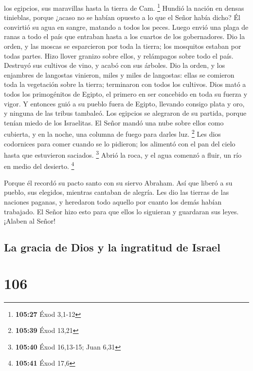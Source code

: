 los egipcios, sus maravillas hasta la tierra de Cam. \footnote{\textbf{105:27}
  Éxod 3,1-12}  Hundió la nación en densas tinieblas,
porque ¿acaso no se habían opuesto a lo que el Señor había dicho?
 Él convirtió su agua en sangre, matando a todos los peces.
 Luego envió una plaga de ranas a todo el país que entraban
hasta a los cuartos de los gobernadores.  Dio la orden, y
las moscas se esparcieron por toda la tierra; los mosquitos estaban por
todas partes.  Hizo llover granizo sobre ellos, y
relámpagos sobre todo el país.  Destruyó sus cultivos de
vino, y acabó con sus árboles.  Dio la orden, y los
enjambres de langostas vinieron, miles y miles de langostas:
 ellas se comieron toda la vegetación sobre la tierra;
terminaron con todos los cultivos.  Dios mató a todos los
primogénitos de Egipto, el primero en ser concebido en toda su fuerza y
vigor.  Y entonces guió a su pueblo fuera de Egipto,
llevando consigo plata y oro, y ninguna de las tribus tambaleó.
 Los egipcios se alegraron de su partida, porque tenían
miedo de los Israelitas.  El Señor mandó una nube sobre
ellos como cubierta, y en la noche, una columna de fuego para darles
luz. \footnote{\textbf{105:39} Éxod 13,21}  Les dios
codornices para comer cuando se lo pidieron; los alimentó con el pan del
cielo hasta que estuvieron saciados. \footnote{\textbf{105:40} Éxod
  16,13-15; Juan 6,31}  Abrió la roca, y el agua comenzó a
fluir, un río en medio del desierto. \footnote{\textbf{105:41} Éxod 17,6}

 Porque él recordó su pacto santo con su siervo Abraham.
 Así que liberó a su pueblo, sus elegidos, mientras
cantaban de alegría.  Les dio las tierras de las naciones
paganas, y heredaron todo aquello por cuanto los demás habían trabajado.
 El Señor hizo esto para que ellos lo siguieran y guardaran
sus leyes. ¡Alaben al Señor!

\hypertarget{la-gracia-de-dios-y-la-ingratitud-de-israel}{%
\subsection{La gracia de Dios y la ingratitud de
Israel}\label{la-gracia-de-dios-y-la-ingratitud-de-israel}}

\hypertarget{section-105}{%
\section{106}\label{section-105}}

